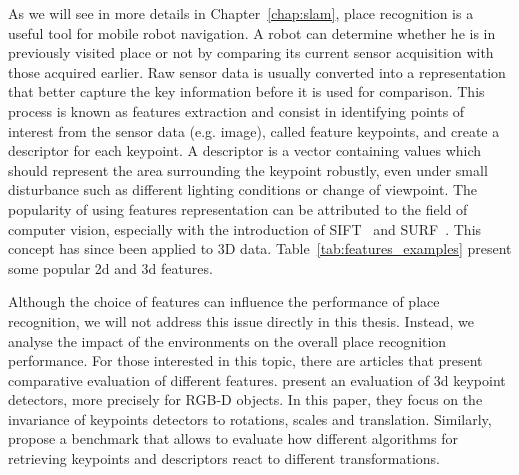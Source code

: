 As we will see in more details in Chapter~\ref{chap:slam}, place recognition is a useful tool for mobile robot navigation. A robot can determine whether he is in previously visited place or not by comparing its current sensor acquisition with those acquired earlier. Raw sensor data is usually converted into a representation that better capture the key information before it is used for comparison. This process is known as features extraction and consist in identifying points of interest from the sensor data (e.g. image), called feature keypoints, and create a descriptor for each keypoint. A descriptor is a vector containing values which should represent the area surrounding the keypoint robustly, even under small disturbance such as different lighting conditions or change of viewpoint. The popularity of using features representation can be attributed to the field of computer vision, especially with the introduction of SIFT~\cite{Lowe2004} and SURF~\cite{Bay2006}. This concept has since been applied to 3D data. Table~\ref{tab:features_examples} present some popular \gls*{2d} and \gls*{3d} features. 

Although the choice of features can influence the performance of place recognition, we will not address this issue directly in this thesis. Instead, we analyse the impact of the environments on the overall place recognition performance. For those interested in this topic, there are articles that present comparative evaluation of different features. \citet{Filipe2014} present an evaluation of \gls*{3d} keypoint detectors, more precisely for RGB-D objects. In this paper, they focus on the invariance of keypoints detectors to rotations, scales and translation. Similarly, \citet{Boyer2011} propose a benchmark that allows to evaluate how different algorithms for retrieving keypoints and descriptors react to different transformations.


